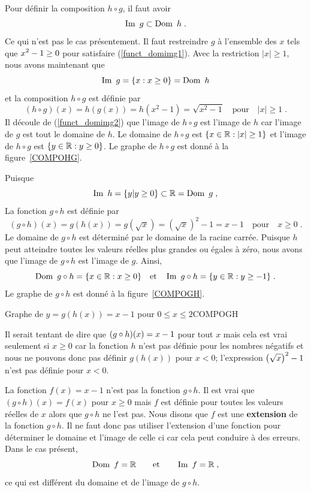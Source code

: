 {\begin{egg}
Pour définir la composition $h \circ g$, il faut avoir
\begin{equation} \label{funct_domimg1}
\IM g \subset \DO h \; .
\end{equation}
Ce qui n'est pas le cas présentement.  Il faut restreindre $g$
à l'ensemble des $x$ tels que $\displaystyle x^2-1 \geq 0$ pour satisfaire
(\ref{funct_domimg1}).  Avec la restriction $|x|\geq 1$, nous avons
maintenant que
\begin{equation} \label{funct_domimg2}
\IM g = \{ x : x\geq 0\} = \DO h
\end{equation}
et la composition $h\circ g$ est définie par
\[
(h\circ g)(x) = h(g(x)) = h(x^2-1) = \sqrt{x^2-1} \quad \text{pour}
\quad |x|\geq 1 \; .
\]
Il découle de (\ref{funct_domimg2}) que l'image de $h\circ g$ est
l'image de $h$ car l'image de $g$ est tout le domaine de $h$.  Le
domaine de $h \circ g$ est $\{ x \in \mathbb{R} : |x| \geq 1 \}$ et l'image
de $h\circ g$ est $\{ y \in \mathbb{R} : y \geq 0 \}$.  Le
graphe de $h\circ g$ est donné à la figure~\ref{COMPOHG}.

Puisque
\[
\IM h = \{ y | y \geq 0 \} \subset \RR = \DO g \; ,
\]
La fonction $g\circ h$ est définie par
\[
(g\circ h)(x) = g(h(x)) = g(\sqrt{x}) = \left(\sqrt{x}\right)^2-1 = x
- 1 \quad \text{pour} \quad x\geq 0 \; .
\]
Le domaine de $g\circ h$ est déterminé par le domaine de la racine
carrée.  Puisque $h$ peut atteindre toutes les valeurs réelles plus
grandes ou égales à zéro, nous avons que l'image de $g\circ h$ est
l'image de $g$.  Ainsi,
\[
\DO g\circ h = \{ x \in \RR : x \geq 0 \} \quad
\text{et} \quad \IM g\circ h = \{ y \in \RR : y \geq -1 \} \;.
\]
Le graphe de $g\circ h$ est donné à la figure~\ref{COMPOGH}.
\end{egg}

{Graphe de $y= g(h(x)) = x -1$ pour $0 \leq x \leq 2$}{COMPOGH}

\begin{rmk}
Il serait tentant de dire que
$\displaystyle (g\circ h)(x) = x - 1$ pour tout $x$ mais cela est vrai
seulement si $x\geq 0$ car la fonction $h$ n'est pas définie pour les
nombres négatifs et nous ne pouvons donc pas définir $g(h(x))$ pour $x<0$;
l'expression $\displaystyle \left(\sqrt{x}\right)^2-1$ n'est pas définie pour $x<0$.

La fonction $f(x) = x -1$ n'est pas la fonction $g\circ h$.  Il est
vrai que $(g\circ h)(x) = f(x)$ pour $x \geq 0$ mais $f$ est définie
pour toutes les valeurs réelles de $x$ alors que $g\circ h$ ne l'est
pas.  Nous disons que $f$ est une {\bfseries extension}
 de la fonction $g\circ h$.  Il ne faut donc
pas utiliser l'extension d'une fonction pour déterminer le domaine et
l'image de celle ci car cela peut conduire à des erreurs.  Dans le cas
présent,
\[
\DO f = \RR \qquad \text{et} \qquad \IM f = \RR \; ,
\]
ce qui est différent du domaine et de l'image de $g\circ h$.
\end{rmk}

}
